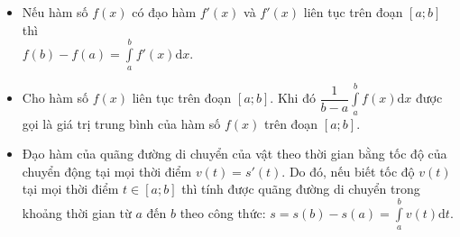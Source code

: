 \begin{nx}
\begin{itemize}
\item Nếu hàm số $f(x)$ có đạo hàm $f'(x)$ và $f'(x)$ liên tục trên đoạn $\left[a;b\right]$ thì\\
$f(b)-f(a)=\displaystyle\int\limits_a^bf'(x)\mathrm{d}x$.
\item Cho hàm số $f(x)$ liên tục trên đoạn $\left[a;b\right]$. Khi đó $\dfrac{1}{b-a}\displaystyle\int\limits_a^bf(x)\mathrm{d}x$ được gọi là giá trị trung bình của hàm số $f(x)$ trên đoạn $\left[a;b\right]$.
\item Đạo hàm của quãng đường di chuyển của vật theo thời gian bằng tốc độ của chuyển động tại mọi thời điểm $v(t)=s'(t)$. Do đó, nếu biết tốc độ $v(t)$ tại mọi thời điểm $t\in\left[a;b\right]$ thì tính được quãng đường di chuyển trong khoảng thời gian từ $a$ đến $b$ theo công thức: $s=s(b)-s(a)=\displaystyle\int\limits_a^bv(t)\mathrm{d}t$.
\end{itemize}
\end{nx}
